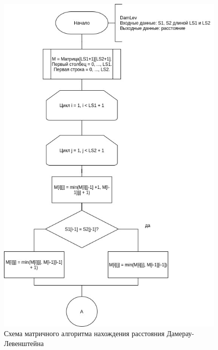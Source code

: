 \begin{figure}[h]
	\centering
	\includegraphics[scale=0.7]{schemes/DamLevTop.jpg}
	\caption{Схема матричного алгоритма нахождения расстояния Дамерау-Левенштейна}
	\label{scheme:damlevmatrtop}
\end{figure}

